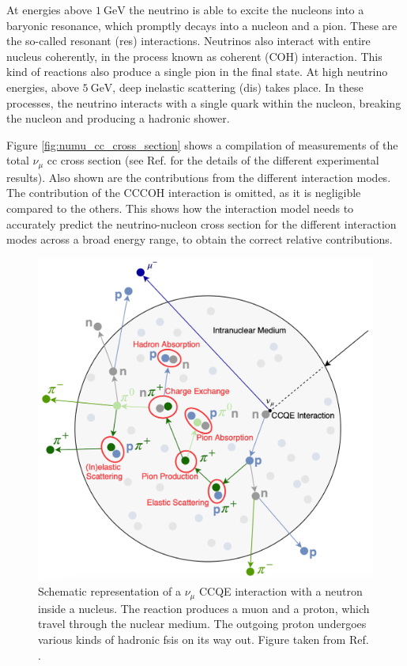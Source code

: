 At energies above $1~\mathrm{GeV}$ the neutrino is able to excite the nucleons into a baryonic resonance, which promptly decays into a nucleon and a pion. These are the so-called resonant (\gls{res}) interactions. Neutrinos also interact with entire nucleus coherently, in the process known as coherent (COH) interaction. This kind of reactions also produce a single pion in the final state. At high neutrino energies, above $5~\mathrm{GeV}$, deep inelastic scattering (\gls{dis}) takes place. In these processes, the neutrino interacts with a single quark within the nucleon, breaking the nucleon and producing a hadronic shower.

Figure \ref{fig:numu_cc_cross_section} shows a compilation of measurements of the total $\nu_{\mu}$ \gls{cc} cross section (see Ref. \cite{Formaggio2012} for the details of the different experimental results). Also shown are the contributions from the different interaction modes. The contribution of the CCCOH interaction is omitted, as it is negligible compared to the others. This shows how the interaction model needs to accurately predict the neutrino-nucleon cross section for the different interaction modes across a broad energy range, to obtain the correct relative contributions.

\begin{figure}[t]
	\centering
	\includegraphics[width=.55\linewidth]{Images/Nu/lars_fsi.png}
	\caption[Schematic representation of a $\nu_{\mu}$ CCQE interaction with a neutron inside a nucleus.]{Schematic representation of a $\nu_{\mu}$ CCQE interaction with a neutron inside a nucleus. The reaction produces a muon and a proton, which travel through the nuclear medium. The outgoing proton undergoes various kinds of hadronic \gls{fsi}s on its way out. Figure taken from Ref. \cite{Bathe-Peters2022}.}
	\label{fig:fsi_diagram}
\end{figure}

